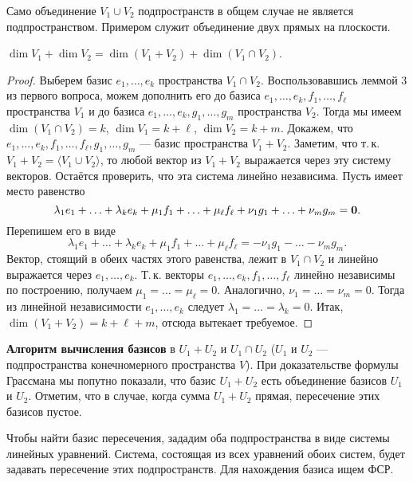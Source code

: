 \begin{remark}
    Само объединение $V_1 \cup V_2$ подпространств в общем случае не является подпространством. Примером служит объединение двух прямых на плоскости.
\end{remark}

\begin{theorem}
    $\dim V_1 + \dim V_2 = \dim(V_1 + V_2) + \dim(V_1 \cap V_2)$.
\end{theorem}

\begin{proof}
    Выберем базис $e_1, \ldots, e_k$ пространства $V_1 \cap V_2$. Воспользовавшись леммой 3 из первого вопроса, можем дополнить его до базиса $e_1, \ldots, e_k, f_1, \ldots, f_\ell$ пространства $V_1$ и до базиса $e_1, \ldots, e_k, g_1, \ldots, g_m$ пространства $V_2$. Тогда мы имеем $\dim(V_1 \cap V_2) = k$, $\dim V_1 = k + \ell$, $\dim V_2 = k + m$. Докажем, что $e_1, \ldots, e_k, f_1, \ldots, f_\ell, g_1, \ldots, g_m$ --- базис пространства $V_1 + V_2$. Заметим, что т.\,к. $V_1 + V_2 = \langle V_1 \cup V_2\rangle$, то любой вектор из $V_1 + V_2$ выражается через эту систему векторов. Остаётся проверить, что эта система линейно независима. Пусть имеет место равенство
    \[
        \lambda_1e_1 + \ldots + \lambda_ke_k + \mu_1f_1 + \ldots + \mu_\ell f_\ell + \nu_1g_1 + \ldots + \nu_mg_m = \boldsymbol{0}.
    \]
    Перепишем его в виде
    \[
        \lambda_1e_1 + \ldots + \lambda_ke_k + \mu_1f_1 + \ldots + \mu_\ell f_\ell = -\nu_1g_1 - \ldots - \nu_mg_m.
    \]
    Вектор, стоящий в обеих частях этого равенства, лежит в $V_1 \cap V_2$ и линейно выражается через $e_1, \ldots, e_k$. Т.\,к. векторы $e_1, \ldots, e_k, f_1, \ldots, f_\ell$ линейно независимы по построению, получаем $\mu_1 = \ldots = \mu_\ell = 0$. Аналогично, $\nu_1 = \ldots = \nu_m = 0$. Тогда из линейной независимости $e_1, \ldots, e_k$ следует $\lambda_1 = \ldots = \lambda_k = 0$. Итак, $\dim(V_1 + V_2) = k + \ell + m$, отсюда вытекает требуемое.
\end{proof}

\textbf{Алгоритм вычисления базисов} в $U_1 + U_2$ и $U_1 \cap U_2$ ($U_1$ и $U_2$ --- подпространства конечномерного пространства $V$). При доказательстве формулы Грассмана мы попутно показали, что базис $U_1 + U_2$ есть объединение базисов $U_1$ и $U_2$. Отметим, что в случае, когда сумма $U_1 + U_2$ прямая, пересечение этих базисов пустое.

Чтобы найти базис пересечения, зададим оба подпространства в виде системы линейных уравнений. Система, состоящая из всех уравнений обоих систем, будет задавать пересечение этих подпространств. Для нахождения базиса ищем ФСР.

